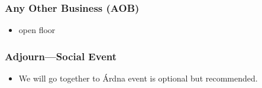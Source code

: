 \documentclass{beamer}
\begin{document}
\begin{frame}
    \frametitle{Any Other Business (AOB)}
    \begin{itemize}
        \item open floor
    \end{itemize}
\end{frame}

\begin{frame}
    \frametitle{Adjourn---Social Event}
    \begin{itemize}
        \item We will go together to Árdna
            event is optional but recommended.
    \end{itemize}
\end{frame}
\end{document}
